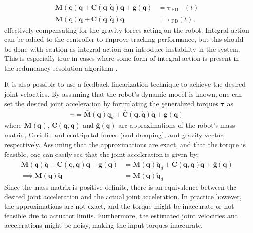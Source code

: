 \begin{subequations}
\begin{align}
    \bm{M}(\bm{q}) \ddot{\bm{q}} + \bm{C}(\bm{q}, \dot{\bm{q}}) \dot{\bm{q}} + \bm{g}(\bm{q}) &= \bm{\tau}_{\mathrm{PD+}}(t) \\
    \bm{M}(\bm{q}) \ddot{\bm{q}} + \bm{C}(\bm{q}, \dot{\bm{q}}) \dot{\bm{q}} &= \bm{\tau}_{\mathrm{PD}}(t),
\end{align}
\end{subequations}
effectively compensating for the gravity forces acting on the robot. Integral
action can be added to the controller to improve tracking performance, but this
should be done with caution as integral action can introduce instability in the
system. This is especially true in cases where some form of integral action is
present in the redundancy resolution algorithm \cite{fossen2021}.

It is also possible to use a feedback linearization technique to achieve the
desired joint velocities. By assuming that the robot's dynamic model is known,
one can set the desired joint acceleration by formulating the generalized
torques $\bm{\tau}$ as
\begin{align}
    \bm{\tau} = \bar{\bm{M}}(\bm{q}) \ddot{\bm{q}}_d + \bar{\bm{C}}(\bm{q}, \dot{\bm{q}}) \dot{\bm{q}} + \bar{\bm{g}}(\bm{q}) \label{eq:torque_feedback_lin}
\end{align}
where $\bar{\bm{M}}(\bm{q})$, $\bar{\bm{C}}(\bm{q}, \dot{\bm{q}})$ and
$\bar{\bm{g}}(\bm{q})$ are approximations of the robot's mass matrix, Coriolis
and centripetal forces (and damping), and gravity vector, respectively. Assuming
that the approximations are exact, and that the torque is feasible, one can easily
see that the joint acceleration is given by:
\begin{subequations}
\begin{align}
    \bm{M}(\bm{q}) \ddot{\bm{q}} + \bm{C}(\bm{q}, \dot{\bm{q}}) \dot{\bm{q}} + \bm{g}(\bm{q}) &= 
    \bar{\bm{M}}(\bm{q}) \ddot{\bm{q}}_d + \bar{\bm{C}}(\bm{q}, \dot{\bm{q}}) \dot{\bm{q}} + \bar{\bm{g}}(\bm{q}) \\
    \implies \bm{M}(\bm{q}) \ddot{\bm{q}} &= \bm{M}(\bm{q}) \ddot{\bm{q}}_d
\end{align}
\end{subequations}
Since the mass matrix is positive definite, there is an equivalence between the
desired joint acceleration and the actual joint acceleration. In practice
however, the approximations are not exact, and the torque might be inaccurate or
not feasible due to actuator limits. Furthermore, the estimated joint velocities
and accelerations might be noisy, making the input torques inaccurate.



